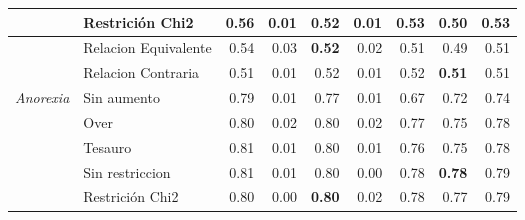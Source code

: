 \begin{table}[h]
\begin{center}
{\begin{tabular}{llrrrrrrr}
                   & Restrición Chi2                         & \textbf{0.56}                        & 0.01                             & 0.52                             & 0.01                             & \textbf{0.53}                    & 0.50                                  & \textbf{0.53}                         \\ \hline
                   & Relacion Equivalente                       & 0.54                                 & 0.03                             & \textbf{0.52}                    & 0.02                             & 0.51                             & 0.49                                  & 0.51                                  \\ \hline
                   & Relacion Contraria                      & 0.51                                 & 0.01                             & 0.52                             & 0.01                             & 0.52                             & \textbf{0.51}                         & 0.51                                  \\ \hline
\textit{Anorexia}  & \cellcolor[HTML]{C0C0C0}Sin aumento     & \cellcolor[HTML]{C0C0C0}0.79         & \cellcolor[HTML]{C0C0C0}0.01     & \cellcolor[HTML]{C0C0C0}0.77     & \cellcolor[HTML]{C0C0C0}0.01     & \cellcolor[HTML]{C0C0C0}0.67     & \cellcolor[HTML]{C0C0C0}0.72          & \cellcolor[HTML]{C0C0C0}0.74          \\ \hline
                   & \cellcolor[HTML]{EFEFEF}Over            & \cellcolor[HTML]{EFEFEF}0.80         & \cellcolor[HTML]{EFEFEF}0.02     & \cellcolor[HTML]{EFEFEF}0.80     & \cellcolor[HTML]{EFEFEF}0.02     & \cellcolor[HTML]{EFEFEF}0.77     & \cellcolor[HTML]{EFEFEF}0.75          & \cellcolor[HTML]{EFEFEF}0.78          \\ \hline
                   & \cellcolor[HTML]{EFEFEF}Tesauro         & \cellcolor[HTML]{EFEFEF}0.81         & \cellcolor[HTML]{EFEFEF}0.01     & \cellcolor[HTML]{EFEFEF}0.80     & \cellcolor[HTML]{EFEFEF}0.01     & \cellcolor[HTML]{EFEFEF}0.76     & \cellcolor[HTML]{EFEFEF}0.75          & \cellcolor[HTML]{EFEFEF}0.78          \\ \hline
                   & \cellcolor[HTML]{EFEFEF}Sin restriccion & \cellcolor[HTML]{EFEFEF}0.81         & \cellcolor[HTML]{EFEFEF}0.01     & \cellcolor[HTML]{EFEFEF}0.80     & \cellcolor[HTML]{EFEFEF}0.00     & \cellcolor[HTML]{EFEFEF}0.78     & \cellcolor[HTML]{EFEFEF}\textbf{0.78} & \cellcolor[HTML]{EFEFEF}0.79          \\ \hline
                   & Restrición Chi2                         & 0.80                                 & 0.00                             & \textbf{0.80}                    & 0.02                             & 0.78                             & 0.77                                  & 0.79                                  \\ \hline

\end{tabular}}
\end{center}
\end{table}
